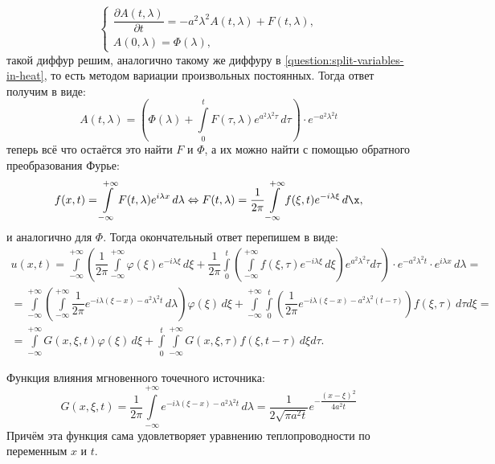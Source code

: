 \[
  \begin{cases}
    \dfrac{\partial A(t, \lambda)}{\partial t}
      = - a^2 \lambda^2 A(t, \lambda)
      + F(t, \lambda), \\
    A(0, \lambda) = \Phi(\lambda),
  \end{cases}
\]
такой диффур решим, аналогично такому же диффуру в \ref{question:split-variables-in-heat}, то
есть методом вариации произвольных постоянных. Тогда ответ получим в виде:
\[
  A(t, \lambda) = \left(
    \Phi(\lambda)
    + \int\limits_0^t F(\tau, \lambda) e^{a^2 \lambda^2 \tau} \, d\tau \right)
    \cdot e^{- a^2 \lambda^2 t}
\]
теперь всё что остаётся это найти $F$ и $\Phi$, а их можно найти с помощью обратного преобразования
Фурье:
\[
  f(x, t) = \int\limits_{-\infty}^{+\infty} F(t, \lambda) e^{i \lambda x} \, d\lambda
  \Leftrightarrow
  F(t, \lambda)
  = \dfrac{1}{2\pi} \int\limits_{-\infty}^{+\infty} f(\xi, t) e^{-i \lambda \xi} \, d\x,
\]
и аналогично для $\Phi$. Тогда окончательный ответ перепишем в виде:
\begin{multline*}
  u(x, t) = \int\limits_{-\infty}^{+\infty}
    \left( \dfrac{1}{2\pi} \int\limits_{-\infty}^{+\infty} \varphi(\xi) e^{-i \lambda \xi} \, d\xi
      + \dfrac{1}{2\pi} \int\limits_0^t
      \left( \int\limits_{-\infty}^{+\infty} f(\xi, \tau) e^{-i \lambda \xi} \, d\xi \right)
      e^{a^2 \lambda^2 \tau} d\tau \right)
    \cdot e^{-a^2 \lambda^2 t} \cdot e^{i \lambda x} \, d\lambda = \\
  = \int\limits_{-\infty}^{+\infty}
    \left( \int\limits_{-\infty}^{+\infty}
      \dfrac{1}{2\pi} e^{-i\lambda (\xi-x) - a^2\lambda^2t} \, d\lambda \right) \varphi(\xi) \, d\xi
  + \int\limits_{-\infty}^{+\infty} \int\limits_{0}^{t}
    \left( \dfrac{1}{2\pi} e^{-i\lambda(\xi-x) - a^2\lambda^2(t - \tau)} \right)
    f(\xi, \tau) \, d\tau d\xi = \\
  = \int\limits_{-\infty}^{+\infty} G(x, \xi, t) \varphi(\xi) \, d\xi
    + \int\limits_0^t \int\limits_{-\infty}^{+\infty} G(x, \xi, \tau) f(\xi, t-\tau) \, d\xi d\tau.
\end{multline*}

Функция влияния мгновенного точечного источника:
\[
  G(x, \xi, t) = \dfrac{1}{2\pi} \int\limits_{-\infty}^{+\infty} e^{-i \lambda(\xi-x) - a^2 \lambda^2 t} \, d\lambda
  = \dfrac{1}{2\sqrt{\pi a^2 t}} e^{- \dfrac{(x-\xi)^2}{4 a^2 t}}
\]
Причём эта функция сама удовлетворяет уравнению теплопроводности по переменным $x$ и $t$.
  
